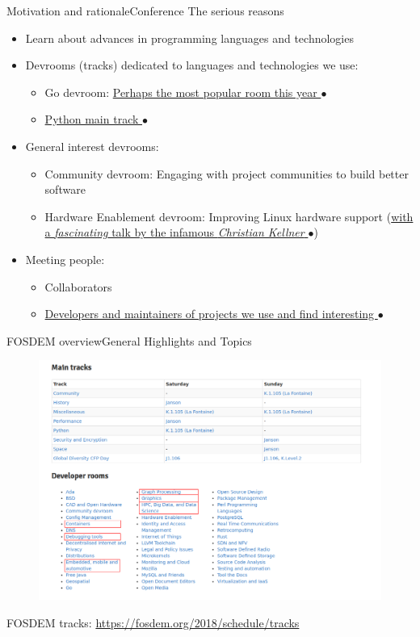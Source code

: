 \documentclass[10pt]{beamer}
\begin{document}
\begin{frame}{Motivation and rationale}{Conference}
    The serious reasons
    \begin{itemize}
        \item Learn about advances in programming languages and technologies
        \item Devrooms (tracks) dedicated to languages and technologies we use:
            \begin{itemize}
                \item Go devroom: \href{./photos/go-devroom-queue.jpg}{Perhaps the most popular room this year $\bullet$}
                \item \href{./photos/python-talk.jpg}{Python main track $\bullet$}
            \end{itemize}
        \item General interest devrooms:
            \begin{itemize}
                \item Community devroom: Engaging with project communities to build better software
                \item Hardware Enablement devroom: Improving Linux hardware support (\href{./photos/kellner-talk.jpg}{with a \emph{fascinating} talk by the infamous \emph{Christian Kellner} $\bullet$})
            \end{itemize}
        \item Meeting people:
            \begin{itemize}
                \item Collaborators
                \item \href{./photos/collab.jpg}{Developers and maintainers of projects we use and find interesting $\bullet$}
            \end{itemize}
    \end{itemize}
\end{frame}

\begin{frame}{FOSDEM overview}{General Highlights and Topics}
    \begin{figure}
        \includegraphics[width=\textwidth]{tracks-devrooms.png}
    \end{figure}

    FOSDEM tracks: \url{https://fosdem.org/2018/schedule/tracks}
\end{frame}
\end{document}
